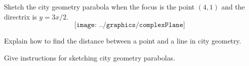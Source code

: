 \break

\begin{prob}
Sketch the city geometry parabola when the focus is the point $(4,1)$
and the directrix is $y=3x/2$.
\[
\texttt{[image: ../graphics/complexPlane]}
\]
\end{prob}

\begin{prob}
Explain how to find the distance between a point and a line in city
geometry.
\end{prob}


\begin{prob}
Give instructions for sketching city geometry parabolas.
\end{prob}


